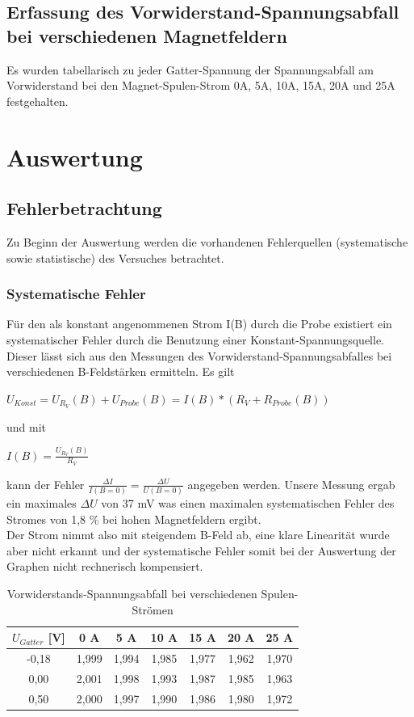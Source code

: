 \documentclass[10pt,a4paper]{article}
\begin{document}
\subsection{Erfassung des Vorwiderstand-Spannungsabfall bei verschiedenen Magnetfeldern}
Es wurden tabellarisch zu jeder Gatter-Spannung der Spannungsabfall am Vorwiderstand bei den Magnet-Spulen-Strom 0A, 5A, 10A, 15A, 20A und 25A festgehalten.\\
\section{Auswertung}
	\subsection{ Fehlerbetrachtung}
	Zu Beginn der Auswertung werden die vorhandenen Fehlerquellen (systematische sowie statistische) des Versuches betrachtet.
\subsubsection{Systematische Fehler}
	 Für den als konstant angenommenen Strom I(B) durch die Probe existiert ein systematischer Fehler durch die Benutzung einer Konstant-Spannungsquelle. Dieser lässt sich aus den Messungen des Vorwiderstand-Spannungsabfalles bei verschiedenen B-Feldstärken ermitteln. Es gilt  
	 \begin{center} $ U_{Konst} = U_{R_V}(B) + U_{Probe}(B) = I(B) *(R_V + R_{Probe}(B))$
	 \end{center}
	 und mit 
	 \begin{center}
	  $ I(B) = \frac{U_{R_V}(B)}{R_V} $ 
	  \end{center} kann der Fehler $ \frac{\Delta I}{I(B=0)} = \frac{\Delta U}{U(B=0)} $ angegeben werden. Unsere Messung ergab ein maximales $\Delta U $ von 37 mV was einen maximalen systematischen Fehler des Stromes von 1,8 \% bei hohen Magnetfeldern ergibt. \\
	 Der Strom nimmt also mit steigendem B-Feld ab, eine klare Linearität wurde aber nicht erkannt und der systematische Fehler somit bei der Auswertung der Graphen nicht rechnerisch kompensiert. 
	\begin{table}[H]
 	\caption{Vorwiderstands-Spannungsabfall bei verschiedenen Spulen-Strömen}
\begin{center}	
	 \begin{tabular}{|c|c|c|c|c|c|c|}
	\hline 
    $U_{Gatter}$ [V] & 0 A & 5 A & 10 A & 15 A & 20 A & 25 A \\ 
	\hline \hline
	-0,18 & 1,999 & 1,994 & 1,985 & 1,977 & 1,962 & 1,970 \\ 
	\hline 
	0,00 & 2,001 & 1,998 & 1,993 & 1,987 & 1,985 & 1,963 \\ 
	\hline 
	0,50 & 2,000 & 1,997 & 1,990 & 1,986 & 1,980 & 1,972 \\ 
	\hline 
	\end{tabular}
\end {center}	
	\end{table}	
\end{document}
